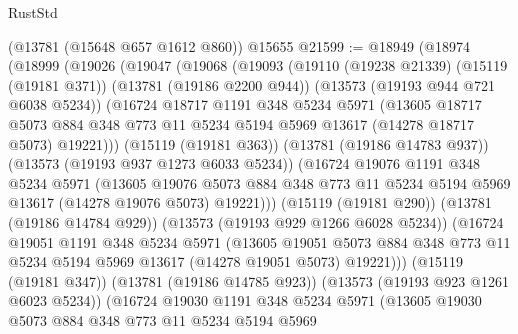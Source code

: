 \begin{lexlean}{RustStd}
\begin{coremodule}
    (@13781 (@15648 @657 @1612 @860))
    @15655
@21599 := @18949
    (@18974
      (@18999
        (@19026
          (@19047
            (@19068
              (@19093
                (@19110
                  (@19238 @21339)
                  (@15119 (@19181 @371))
                  (@13781 (@19186 @2200 @944))
                  (@13573 (@19193 @944 @721 @6038 @5234))
                  (@16724
                    @18717
                    @1191
                    @348
                    @5234
                    @5971
                    (@13605
                      @18717
                      @5073
                      @884
                      @348
                      @773
                      @11
                      @5234
                      @5194
                      @5969
                      @13617
                      (@14278 @18717 @5073)
                      @19221)))
                (@15119 (@19181 @363))
                (@13781 (@19186 @14783 @937))
                (@13573 (@19193 @937 @1273 @6033 @5234))
                (@16724
                  @19076
                  @1191
                  @348
                  @5234
                  @5971
                  (@13605
                    @19076
                    @5073
                    @884
                    @348
                    @773
                    @11
                    @5234
                    @5194
                    @5969
                    @13617
                    (@14278 @19076 @5073)
                    @19221)))
              (@15119 (@19181 @290))
              (@13781 (@19186 @14784 @929))
              (@13573 (@19193 @929 @1266 @6028 @5234))
              (@16724
                @19051
                @1191
                @348
                @5234
                @5971
                (@13605
                  @19051
                  @5073
                  @884
                  @348
                  @773
                  @11
                  @5234
                  @5194
                  @5969
                  @13617
                  (@14278 @19051 @5073)
                  @19221)))
            (@15119 (@19181 @347))
            (@13781 (@19186 @14785 @923))
            (@13573 (@19193 @923 @1261 @6023 @5234))
            (@16724
              @19030
              @1191
              @348
              @5234
              @5971
              (@13605
                @19030
                @5073
                @884
                @348
                @773
                @11
                @5234
                @5194
                @5969

\end{coremodule}
\end{lexlean}
